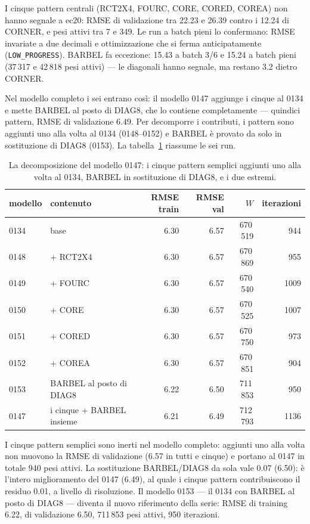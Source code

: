 I cinque pattern centrali (RCT2X4, FOURC, CORE, CORED, COREA)
non hanno segnale a ec20: RMSE di validazione tra 22.23 e 26.39
contro i 12.24 di CORNER, e pesi attivi tra 7 e 349. Le run a
batch pieni lo confermano: RMSE invariate a due decimali e
ottimizzazione che si ferma anticipatamente
(\texttt{LOW\_PROGRESS}). BARBEL fa eccezione: 15.43 a batch 3/6
e 15.24 a batch pieni (37\,317 e 42\,818 pesi attivi) — le
diagonali hanno segnale, ma restano 3.2 dietro CORNER.

Nel modello completo i sei entrano così: il modello 0147 aggiunge
i cinque al 0134 e mette BARBEL al posto di DIAG8, che lo contiene
completamente — quindici pattern, RMSE di validazione 6.49. Per
decomporre i contributi, i pattern sono aggiunti uno alla volta al
0134 (0148--0152) e BARBEL è provato da solo in sostituzione di
DIAG8 (0153). La tabella~\ref{tab:decomposizione} riassume le sei run.

\begin{table}[ht]
\centering
\small
\begin{tabular}{llrrrr}
\toprule
modello & contenuto & RMSE train & RMSE val & $W$ & iterazioni \\
\midrule
0134 & base & 6.30 & 6.57 & 670\,519 & 944 \\
0148 & + RCT2X4 & 6.30 & 6.57 & 670\,869 & 955 \\
0149 & + FOURC & 6.30 & 6.57 & 670\,540 & 1009 \\
0150 & + CORE & 6.30 & 6.57 & 670\,525 & 1007 \\
0151 & + CORED & 6.30 & 6.57 & 670\,750 & 973 \\
0152 & + COREA & 6.30 & 6.57 & 670\,851 & 904 \\
0153 & BARBEL al posto di DIAG8 & 6.22 & 6.50 & 711\,853 & 950 \\
0147 & i cinque + BARBEL insieme & 6.21 & 6.49 & 712\,793 & 1136 \\
\bottomrule
\end{tabular}
\caption{La decomposizione del modello 0147: i cinque pattern
semplici aggiunti uno alla volta al 0134, BARBEL in sostituzione di
DIAG8, e i due estremi.}
\label{tab:decomposizione}
\end{table}

I cinque pattern semplici sono inerti nel modello completo:
aggiunti uno alla volta non muovono la RMSE di validazione (6.57
in tutti e cinque) e portano al 0147 in totale 940 pesi attivi.
La sostituzione BARBEL/DIAG8 da sola vale 0.07 (6.50): è l'intero
miglioramento del 0147 (6.49), al quale i cinque pattern
contribuiscono il residuo 0.01, a livello di risoluzione. Il
modello 0153 — il 0134 con BARBEL al posto di DIAG8 — diventa il
nuovo riferimento della serie: RMSE di training 6.22, di
validazione 6.50, 711\,853 pesi attivi, 950 iterazioni.
